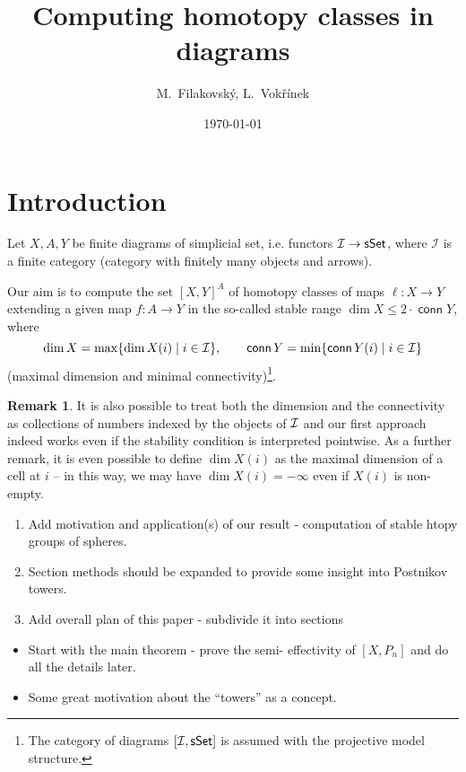 \documentclass[12pt,a4wide]{article}
\theoremstyle{plain}
\theoremstyle{definition}
\newtheorem{remark}[thm]{Remark}
\newcommand{\conn}{\mathop{\mathsf{conn}}}
\renewcommand\:{\colon}
\newcommand{\icat}{\mathcal I}
\begin{document}
\author{M.\ Filakovsk\'{y}, L.\ Vok\v{r}\'{i}nek}
\title{Computing homotopy classes in diagrams}
\date{\today}
\maketitle

\section{Introduction}
Let $X,A,Y$ be finite diagrams of simplicial set, i.e. functors $\icat \to \sSet$, where $\icat$ is a finite category (category with finitely many objects and arrows).

Our aim is to compute the set $[X, Y]^A$ of homotopy classes of maps $\ell \colon X \to Y$ extending a given map $f \colon A \to Y$ in the so-called stable range $\dim X \leq 2 \cdot \conn Y$, where
\[\dim X = \max \{ \dim X(i) \mid i \in \mcI \}, \qquad \conn Y = \min \{ \conn Y(i) \mid i \in \mcI \}\]
(maximal dimension and minimal connectivity)\footnote{The category of diagrams  $[\icat, \sSet]$ is assumed with the projective model structure.}. 

\begin{remark}\label{rem:pointwise}
It is also possible to treat both the dimension and the connectivity as collections of numbers indexed by the objects of $\mathcal I$ and our first approach indeed works even if the stability condition is interpreted pointwise. As a further remark, it is even possible to define $\dim X(i)$ as the maximal dimension of a cell at $i$ -- in this way, we may have $\dim X(i) = -\infty$ even if $X(i)$ is non-empty.
\end{remark}

{\color{red}
\begin{enumerate}
\item Add motivation and application(s) of our result - computation of stable htopy groups of spheres.
\item Section methods should be expanded to provide some insight into Postnikov towers.
\item Add overall plan of this paper - subdivide it into sections 
\end{enumerate}
}

\begin{itemize}
\item Start with the main theorem - prove the semi- effectivity of $[X, P_n]$ and do all the details later.
\item Some great motivation about the ``towers'' as a concept.
\end{itemize}
\end{document}
